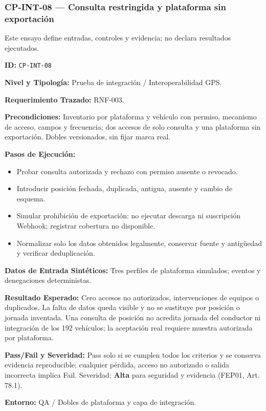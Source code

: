 \subsubsection*{CP-INT-08 — Consulta restringida y plataforma sin exportación}\label{sec:9-cp-int-08}

Este ensayo define entradas, controles y evidencia; no declara resultados ejecutados.

\par\noindent\textbf{ID:} \texttt{CP-\allowbreak{}INT-\allowbreak{}08}\par
\par\noindent\textbf{Nivel y Tipología:} Prueba de integración / Interoperabilidad GPS.\par
\par\noindent\textbf{Requerimiento Trazado:} RNF-003.\par
\par\noindent\textbf{Precondiciones:} Inventario por plataforma y vehículo con permiso, mecanismo de acceso, campos y frecuencia; dos accesos de solo consulta y una plataforma sin exportación. Dobles versionados, sin fijar marca real.\par
\par\noindent\textbf{Pasos de Ejecución:}\par
\begin{itemize}
\item Probar consulta autorizada y rechazo con permiso ausente o revocado.
\item Introducir posición fechada, duplicada, antigua, ausente y cambio de esquema.
\item Simular prohibición de exportación: no ejecutar descarga ni suscripción Webhook; registrar cobertura no disponible.
\item Normalizar solo los datos obtenidos legalmente, conservar fuente y antigüedad y verificar deduplicación.
\end{itemize}

\par\noindent\textbf{Datos de Entrada Sintéticos:} Tres perfiles de plataforma simulados; eventos y denegaciones deterministas.\par
\par\noindent\textbf{Resultado Esperado:} Cero accesos no autorizados, intervenciones de equipos o duplicados. La falta de datos queda visible y no se sustituye por posición o jornada inventada. Una consulta de posición no acredita jornada del conductor ni integración de los 192 vehículos; la aceptación real requiere muestra autorizada por plataforma.\par
\par\noindent\textbf{Pass/Fail y Severidad:} Pass solo si se cumplen todos los criterios y se conserva evidencia reproducible; cualquier pérdida, acceso no autorizado o salida incorrecta implica Fail. Severidad: \textbf{Alta} para seguridad y evidencia (FEP01, Art. 78.1).\par
\par\noindent\textbf{Entorno:} QA / Dobles de plataforma y capa de integración.\par


